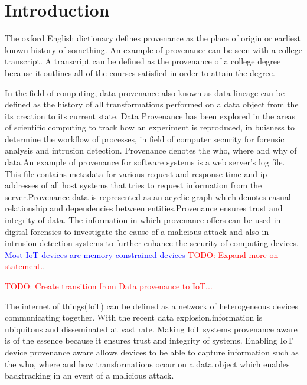 \chapter{Introduction}\label{chapter:introduction}
The oxford English dictionary defines provenance as the place of origin or earliest known history of something. An example of provenance can be seen with a college transcript. A transcript can be defined as the provenance of a college degree because it outlines all of the courses satisfied in order to attain the degree.

\par In the field of computing, data provenance also known as data lineage can be defined as the history of all transformations performed on a data object from the its creation to its current state. Data Provenance has been explored in the areas of scientific computing to track how an experiment is reproduced, in buisness to determine the workflow of  processes, in field of computer security for forensic analysis and intrusion detection. Provenance denotes the who, where and why of data.An example of provenance for software systems is a web server's log file. This file contains metadata for various request and response time and ip addresses of all host systems that tries to request information from the server.Provenance data is represented as an acyclic graph which denotes casual relationship and dependencies between entities.Provenance ensures trust and integrity of data. The information in which provenance offers can be used in digital forensics to investigate the cause of a malicious attack and also in intrusion detection systems to further enhance the security of computing devices.  \textcolor{blue}{Most IoT devices are memory constrained devices} \textcolor{red}{TODO: Expand more on statement.}.

 
\textcolor{red}{TODO: Create transition from Data provenance to IoT...}


The internet of things(IoT) can be defined as a network of heterogeneous devices communicating together. With the recent data explosion,information is ubiquitous and  disseminated at vast rate. Making IoT systems provenance aware is of the essence because it ensures trust and  integrity of systems. Enabling IoT device provenance aware allows devices to be able to capture information such as the who, where and how transformations occur on a data object which enables  backtracking in an event of a malicious attack.



